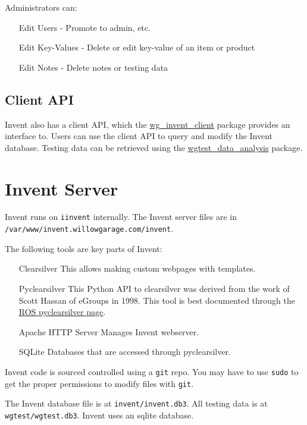 \documentclass[11pt]{report}
\begin{document}
Administrators can:
\begin{itemize}
\item[Edit Users] - Promote to admin, etc.
\item[Edit Key-Values] - Delete or edit key-value of an item or product
\item[Edit Notes] - Delete notes or testing data
\end{itemize}

\subsection{Client API}

Invent also has a client API, which the \href{http://www.ros.org/wiki/wg\_invent\_client}{wg\_invent\_client} package provides an interface to. Users can use the client API to query and modify the Invent database. Testing data can be retrieved using the \href{http://www.ros.org/wiki/wgtest\_data\_analysis}{wgtest\_data\_analysis} package.


\section {Invent Server}

Invent runs on \texttt{iinvent} internally. The Invent server files are in \texttt{/var/www/invent.willowgarage.com/invent}. 

The following tools are key parts of Invent:
\begin{itemize}
\item [Clearsilver] This allows making custom webpages with templates.
\item [Pyclearsilver] This Python API to clearsilver was derived from the work of Scott Hassan of eGroups in 1998. This tool is best documented through the \href{http://www.ros.org/wiki/pyclearsilver}{ROS pyclearsilver page}.
\item [Apache HTTP Server] Manages Invent webserver.
\item [SQLite] Databases that are accessed through pyclearsilver.
\end{itemize}

Invent code is sourced controlled using a \texttt{git} repo. You may have to use \texttt{sudo} to get the proper permissions to modify files with \texttt{git}.

The Invent database file is at \texttt{invent/invent.db3}. All testing data is at \texttt{wgtest/wgtest.db3}. Invent uses an sqlite database.
\end{document}
